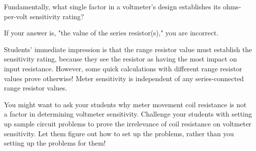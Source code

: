 

Fundamentally, what single factor in a voltmeter's design establishes its ohms-per-volt sensitivity rating?







If your answer is, "the value of the series resistor(s)," you are incorrect.







Students' immediate impression is that the range resistor value must establish the sensitivity rating, because they see the resistor as having the most impact on input resistance.  However, some quick calculations with different range resistor values prove otherwise!  Meter sensitivity is independent of any series-connected range resistor values.

You might want to ask your students why meter movement coil resistance is not a factor in determining voltmeter sensitivity.  Challenge your students with setting up sample circuit problems to prove the irrelevance of coil resistance on voltmeter sensitivity.  Let them figure out how to set up the problems, rather than you setting up the problems for them!



